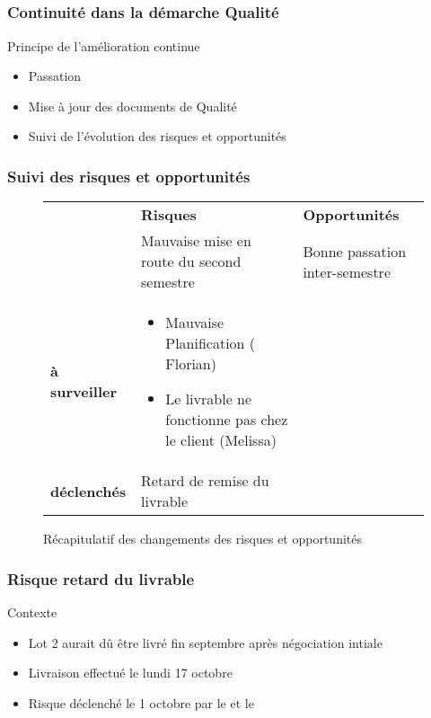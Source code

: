 
\speaker{\Kafui}

\subsection{} %


\begin{frame}
\frametitle{Continuité dans la démarche Qualité}
\begin{block}{Principe de l'amélioration continue}
\begin{itemize}
\item Passation 
\item Mise à jour des documents de Qualité
\item Suivi de l'évolution des risques et opportunités
\end{itemize}
\end{block}
\end{frame}




\begin{frame}
\frametitle{Suivi des risques et opportunités}
\begin{figure}
\begin{longtable}{|p{1.8cm}||p{3.5cm}|p{3.5cm}|}
\hline
 & \textbf{Risques} & \textbf{Opportunités} \\\hhline{|=||=|=|}
\multirow{1}{*}{\textbf{clôturés}} & \small Mauvaise mise en route du second semestre & \small Bonne passation inter-semestre \\\hline
\multirow{1}{*}{\textbf{à surveiller}} & \small \begin{itemize}	
						\item Mauvaise Planification ( Florian)
						\item Le livrable ne fonctionne pas chez le client (Melissa)
						\end{itemize}& \\\hline
\multirow{1}{*}{\textbf{déclenchés}} & \small Retard de remise du livrable & \\\hline
\end{longtable}
\caption{Récapitulatif des changements des risques et opportunités}
\end{figure}
\end{frame}



\begin{frame}
\frametitle{Risque retard du livrable}
\begin{block}{Contexte}
\begin{itemize}
\item Lot 2 aurait dû être livré fin septembre après négociation intiale
\item Livraison effectué le lundi 17 octobre
\item Risque déclenché le 1 octobre par le \RQ{} et le \CP{}
\end{itemize}
\end{block}
\end{frame}

